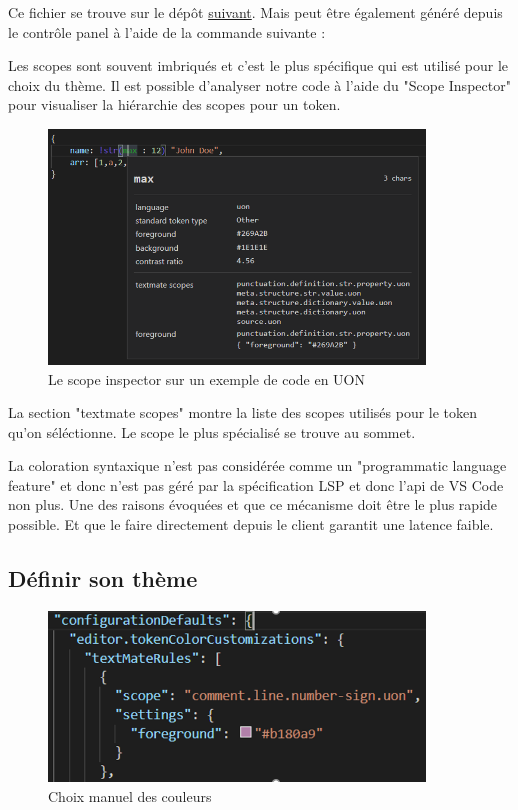 \documentclass[
    iict, %
    il, %
]{heig-tb}
\begin{document}
Ce fichier se trouve sur le dépôt \href{https://github.com/microsoft/vscode/blob/main/extensions/theme-defaults/themes/dark_vs.json}{suivant}.
Mais peut être également généré depuis le contrôle panel à l'aide de la commande suivante : %

Les scopes sont souvent imbriqués et c'est le plus spécifique qui est utilisé pour le choix du thème.
Il est possible d'analyser notre code à l'aide du "Scope Inspector" pour visualiser la hiérarchie des scopes pour un token.

\begin{figure}[!h]
    \begin{center}
        \includegraphics[width=10cm]{assets/figures/scope-inspector.png}
    \end{center}
    \caption[Scope inspector]{\label{basic-uon} Le scope inspector sur un exemple de code en UON}
\end{figure}

La section "textmate scopes" montre la liste des scopes utilisés pour le token qu'on séléctionne. Le scope le plus spécialisé se trouve au sommet.

La coloration syntaxique n'est pas considérée comme un "programmatic language feature" et donc n'est pas géré par la spécification LSP et donc l'api de VS Code non plus. 
Une des raisons évoquées et que ce mécanisme doit être le plus rapide possible. Et que le faire directement depuis le client garantit une latence faible.

\subsection{Définir son thème}
\begin{figure}[!h]
    \begin{center}
        \includegraphics[width=10cm]{assets/figures/manual-settings-color.png}
    \end{center}
    \caption[Choix manuel des couleurs]{\label{manual-settings-color} Choix manuel des couleurs}
\end{figure}
\end{document}
